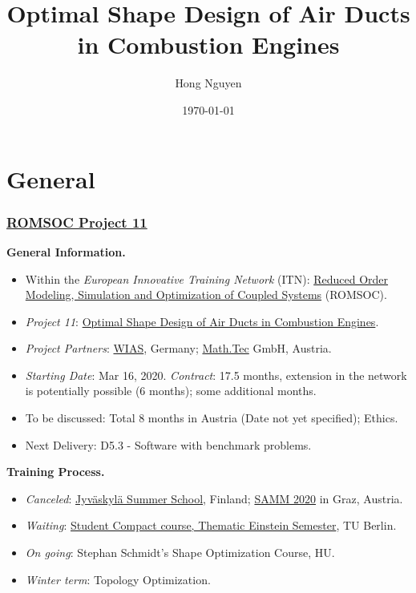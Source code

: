 \documentclass[t,xcolor=table,english]{beamer}   %
\begin{document}
\title{Optimal Shape Design of Air Ducts in Combustion Engines}
\author{Hong Nguyen}
\date{\today}

\wiasTitleSlide

\section[General]{General}
\begin{frame}
	\frametitle{\href{https://www.romsoc.eu/optimal-shape-design-of-air-ducts-in-combustion-engines/}{ROMSOC Project 11}}
	\textbf{General Information.}
	\begin{itemize}
		\item Within the \textit{European Innovative Training Network} (ITN): \href{https://www.romsoc.eu/}{Reduced Order Modeling, Simulation and Optimization of Coupled Systems} (ROMSOC).
		\item \textit{Project 11}: \href{https://www.romsoc.eu/optimal-shape-design-of-air-ducts-in-combustion-engines/}{Optimal Shape Design of Air Ducts in Combustion Engines}.
		\item \textit{Project Partners}: \href{https://www.wias-berlin.de/}{WIAS}, Germany; \href{https://mathtec.at/}{Math.Tec} GmbH, Austria.
		\item \textit{Starting Date}: Mar 16, 2020. \textit{Contract}: 17.5 months, extension in the network is potentially possible (6 months); some additional months. 
		\item To be discussed: Total 8 months in Austria (Date not yet specified); Ethics.
		\item Next Delivery: D5.3 - Software with benchmark problems.
	\end{itemize}
	\textbf{Training Process.} 
	\begin{itemize}
	\item \textit{Canceled}: \href{https://www.jyu.fi/en/research/summer-and-winter-schools/jss/courses/courses-in-mathematics}{Jyv\"askyl\"a Summer School}, Finland; \href{https://www.applied.math.tugraz.at/tagungen/samm20/}{SAMM 2020} in Graz, Austria.
	\item \textit{Waiting}: \href{http://www.wias-berlin.de/events/TESenergy/\#studentcompactcourse}{Student Compact course, Thematic Einstein Semester}, TU Berlin.
	\item \textit{On going}: Stephan Schmidt's Shape Optimization Course, HU.
	\item \textit{Winter term}: Topology Optimization.
\end{itemize}
\end{frame}
\end{document}
